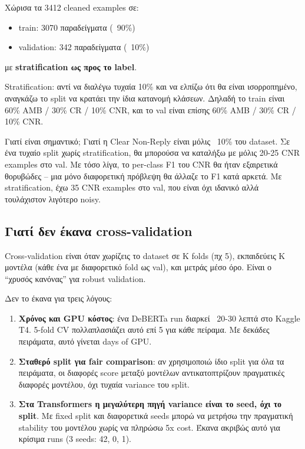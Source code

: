 \documentclass[12pt]{fphw}
\begin{document}
Χώρισα τα 3412 cleaned examples σε:

\begin{itemize}
    \item train: 3070 παραδείγματα (~90\%)
    \item validation: 342 παραδείγματα (~10\%)
\end{itemize}

με \textbf{stratification ως προς το label}.

Stratification: αντί να διαλέγω τυχαία 10\% και να ελπίζω ότι θα είναι ισορροπημένο, αναγκάζω το split να κρατάει την ίδια κατανομή κλάσεων. Δηλαδή το train είναι 60\% AMB / 30\% CR / 10\% CNR, και το val είναι επίσης 60\% AMB / 30\% CR / 10\% CNR.

Γιατί είναι σημαντικό; Γιατί η Clear Non-Reply είναι μόλις ~10\% του dataset. Σε ένα τυχαίο split χωρίς stratification, θα μπορούσα να καταλήξω με μόλις 20-25 CNR examples στο val. Με τόσο λίγα, το per-class F1 του CNR θα ήταν εξαιρετικά θορυβώδες -- μια μόνο διαφορετική πρόβλεψη θα άλλαζε το F1 κατά αρκετά. Με stratification, έχω 35 CNR examples στο val, που είναι όχι ιδανικό αλλά τουλάχιστον λιγότερο noisy.

\subsection{Γιατί δεν έκανα cross-validation}

Cross-validation είναι όταν χωρίζεις το dataset σε K folds (πχ 5), εκπαιδεύεις K μοντέλα (κάθε ένα με διαφορετικό fold ως val), και μετράς μέσο όρο. Είναι ο ``χρυσός κανόνας'' για robust validation.

Δεν το έκανα για τρεις λόγους:

\begin{enumerate}
    \item \textbf{Χρόνος και GPU κόστος}: ένα DeBERTa run διαρκεί ~20-30 λεπτά στο Kaggle T4. 5-fold CV πολλαπλασιάζει αυτό επί 5 για κάθε πείραμα. Με δεκάδες πειράματα, αυτό γίνεται days of GPU.
    \item \textbf{Σταθερό split για fair comparison}: αν χρησιμοποιώ ίδιο split για όλα τα πειράματα, οι διαφορές score μεταξύ μοντέλων αντικατοπτρίζουν πραγματικές διαφορές μοντέλου, όχι τυχαία variance του split.
    \item \textbf{Στα Transformers η μεγαλύτερη πηγή variance είναι το seed, όχι το split}. Με fixed split και διαφορετικά seeds μπορώ να μετρήσω την πραγματική stability του μοντέλου χωρίς να πληρώσω 5x cost. Έκανα ακριβώς αυτό για κρίσιμα runs (3 seeds: 42, 0, 1).
\end{enumerate}
\end{document}
